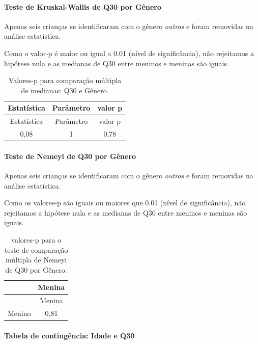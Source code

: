 \documentclass[]{article}
\let\oldparagraph\paragraph
\renewcommand{\paragraph}[1]{\oldparagraph{#1}\mbox{}}
\begin{document}
\hypertarget{teste-de-kruskal-wallis-de-q30-por-guxeanero}{%
\paragraph{Teste de Kruskal-Wallis de Q30 por Gênero}\label{teste-de-kruskal-wallis-de-q30-por-guxeanero}}

Apenas seis crianças se identificaram com o gênero \emph{outros} e foram removidas na análise estatística.

Como o valor-p é maior ou igual a 0.01 (nível de significância), não rejeitamos a hipótese nula e as medianas de Q30 entre meninos e meninas são iguais.

\begin{longtable}[]{@{}ccc@{}}
\caption{\label{tab:unnamed-chunk-974}Valores-p para comparação múltipla de medianas: Q30 e Gênero.}\tabularnewline
\toprule
Estatística & Parâmetro & valor p\tabularnewline
\midrule
\endfirsthead
\toprule
Estatística & Parâmetro & valor p\tabularnewline
\midrule
\endhead
0,08 & 1 & 0,78\tabularnewline
\bottomrule
\end{longtable}

\hypertarget{teste-de-nemeyi-de-q30-por-guxeanero}{%
\paragraph{Teste de Nemeyi de Q30 por Gênero}\label{teste-de-nemeyi-de-q30-por-guxeanero}}

Apenas seis crianças se identificaram com o gênero \emph{outros} e foram removidas na análise estatística.

Como os valores-p são iguais ou maiores que 0.01 (nível de significância), não rejeitamos a hipótese nula e as medianas de Q30 entre meninos e meninas são iguais.

\begin{longtable}[]{@{}lc@{}}
\caption{\label{tab:unnamed-chunk-976}valores-p para o teste de comparação múltipla de Nemeyi de Q30 por Gênero.}\tabularnewline
\toprule
& Menina\tabularnewline
\midrule
\endfirsthead
\toprule
& Menina\tabularnewline
\midrule
\endhead
Menino & 0,81\tabularnewline
\bottomrule
\end{longtable}

\cleardoublepage

\hypertarget{tabela-de-continguxeancia-idade-e-q30}{%
\paragraph{Tabela de contingência: Idade e Q30}\label{tabela-de-continguxeancia-idade-e-q30}}
\end{document}
